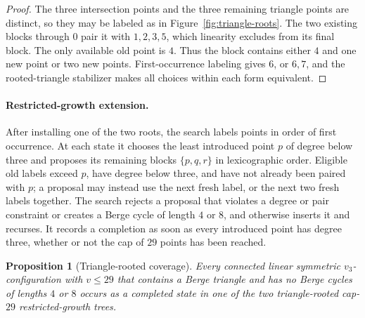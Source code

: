 \documentclass[11pt]{article}
\newtheorem{proposition}[theorem]{Proposition}
\theoremstyle{definition}
\begin{document}
\begin{proof}
The three intersection points and the three remaining triangle points are
distinct, so they may be labeled as in Figure~\ref{fig:triangle-roots}.
The two existing blocks through \(0\) pair it with \(1,2,3,5\), which
linearity excludes from its final block. The only available old point is
\(4\). Thus the block contains either \(4\) and one new point or two new
points. First-occurrence labeling gives \(6\), or \(6,7\), and the
rooted-triangle stabilizer makes all choices within each form equivalent.
\end{proof}

\paragraph{Restricted-growth extension.}
After installing one of the two roots, the search labels points in order of
first occurrence. At each state it chooses the least introduced point \(p\)
of degree below three and proposes its remaining blocks
\(\{p,q,r\}\) in lexicographic order. Eligible old labels exceed \(p\), have
degree below three, and have not already been paired with \(p\); a proposal
may instead use the next fresh label, or the next two fresh labels together.
The search rejects a proposal that violates a degree or pair constraint or
creates a Berge cycle of length \(4\) or \(8\), and otherwise inserts it and
recurses. It records a completion as soon as every introduced point has
degree three, whether or not the cap of \(29\) points has been reached.

\begin{proposition}[Triangle-rooted coverage]\label{prop:triangle-coverage}
Every connected linear symmetric \(v_3\)-configuration with \(v\leq29\)
that contains a Berge triangle and has no Berge cycles of lengths \(4\) or
\(8\) occurs as a completed state in one of the two triangle-rooted
cap-\(29\) restricted-growth trees.
\end{proposition}
\end{document}
